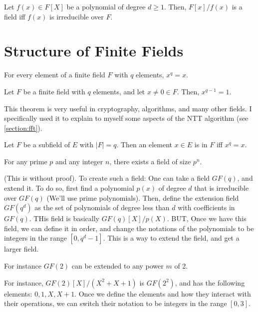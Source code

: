 \begin{theorem}
    Let $f(x)\in F[X]$ be a polynomial of degree $d\ge 1$.
    Then, $F[x]/f(x)$ is a field iff $f(x)$ is irreducible over $F$.
\end{theorem}


\section{Structure of Finite Fields}




\begin{theorem}\label{fermats-little-theorem}
    For every element of a finite field $F$ with $q$ elements, 
    $x^q=x$. 
\end{theorem}

\begin{corollary}
    Let $F$ be a finite field with $q$ elements, and let $x\ne0\in F$.
    Then, $x^{q-1}=1$.
\end{corollary}

This theorem is very useful in cryptography, algorithms, and many other fields.
I specifically used it to explain to myself some aspects of the NTT algorithm (see \autoref{section:fft}). 


\begin{corollary}
    Let $F$ be a subfield of $E$ with $|F|=q$. Then 
    an element $x\in E$ is in $F$ iff $x^q=x$.
\end{corollary}



\begin{theorem}
    For any prime $p$ and any integer $n$, there exists a field of size $p^n$.
\end{theorem}

(This is without proof). 
To create such a field:
One can take a field $GF(q)$, and extend it.
To do so, first find a polynomial $p(x)$ of degree $d$ that is irreducible over $GF(q)$
(We'll use prime polynomials).
Then, define the extension field $GF(q^d)$ as the set of polynomials of degree less than $d$ with coefficients in $GF(q)$.
THis field is basically $GF(q)[X]/p(X)$. BUT, Once we have this field, 
we can define it in order, and change the notations of the polynomials to be integers 
in the range $[0,q^d-1]$. This is a way to extend the field, and get a larger field.


For instance $GF(2)$ can be extended to any power $m$ of 2.

For instance, $GF(2)[X]/(X^2+X+1)$ is $GF(2^2)$, and has the following elements:
$0,1,X,X+1$. Once we define the elements and how they interact with their operations, we can 
switch their notation to be integers in the range $[0,3]$. 

